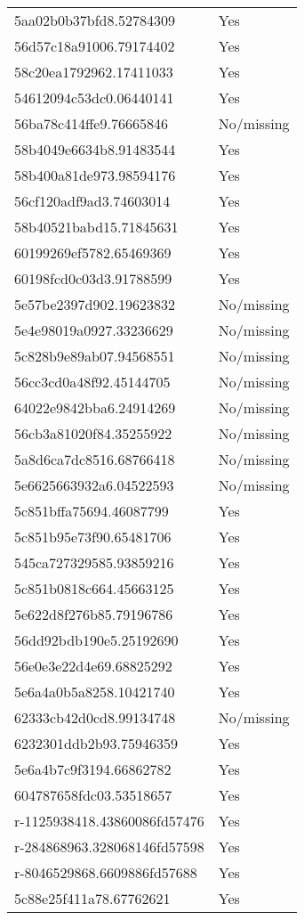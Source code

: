 \begin{tabular}{ll}
5aa02b0b37bfd8.52784309 & Yes \\
56d57c18a91006.79174402 & Yes \\
58c20ea1792962.17411033 & Yes \\
54612094c53dc0.06440141 & Yes \\
56ba78c414ffe9.76665846 & No/missing \\
58b4049e6634b8.91483544 & Yes \\
58b400a81de973.98594176 & Yes \\
56cf120adf9ad3.74603014 & Yes \\
58b40521babd15.71845631 & Yes \\
60199269ef5782.65469369 & Yes \\
60198fcd0c03d3.91788599 & Yes \\
5e57be2397d902.19623832 & No/missing \\
5e4e98019a0927.33236629 & No/missing \\
5c828b9e89ab07.94568551 & No/missing \\
56cc3cd0a48f92.45144705 & No/missing \\
64022e9842bba6.24914269 & No/missing \\
56cb3a81020f84.35255922 & No/missing \\
5a8d6ca7dc8516.68766418 & No/missing \\
5e6625663932a6.04522593 & No/missing \\
5c851bffa75694.46087799 & Yes \\
5c851b95e73f90.65481706 & Yes \\
545ca727329585.93859216 & Yes \\
5c851b0818c664.45663125 & Yes \\
5e622d8f276b85.79196786 & Yes \\
56dd92bdb190e5.25192690 & Yes \\
56e0e3e22d4e69.68825292 & Yes \\
5e6a4a0b5a8258.10421740 & Yes \\
62333cb42d0cd8.99134748 & No/missing \\
6232301ddb2b93.75946359 & Yes \\
5e6a4b7c9f3194.66862782 & Yes \\
604787658fdc03.53518657 & Yes \\
r-1125938418.43860086fd57476 & Yes \\
r-284868963.328068146fd57598 & Yes \\
r-8046529868.6609886fd57688 & Yes \\
5c88e25f411a78.67762621 & Yes \\

\end{tabular}
